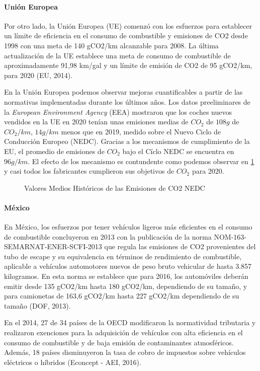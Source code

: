 \paragraph{Unión Europea}
Por otro lado, la Unión Europea (UE) comenzó con los esfuerzos para establecer un límite de eficiencia en el consumo de combustible y emisiones de CO2 desde 1998 con una meta de 140 gCO2/km alcanzable para 2008. La última actualización de la UE establece una meta de consumo de combustible de aproximadamente 91,98 km/gal y un límite de emisión de CO2 de 95 gCO2/km, para 2020 (EU, 2014). \cite{InformeFinal_WRI}

En la Unión Europea podemos observar mejoras cuantificables a partir de las normativas implementadas durante los últimos años. Los datos preeliminares de la \textit{European Environment Agency} (EEA) mostraron que los coches nuevos vendidos en la UE en 2020 tenían unas emisiones medias de $CO_2$ de $108g$ de $CO_2/km$, $14g/km$ menos que en 2019, medido sobre el Nuevo Ciclo de Conducción Europeo (NEDC). \cite{ICCT_Performance_2020} Gracias a los mecanismos de cumplimiento de la EU, el promedio de emisiones de $CO_2$ bajo el Cíclo NEDC se encuentra en $96 g/km$. El efecto de los mecanismo es contundente como podemos observar en \ref{fig:iccp-performance} y casi todos los fabricantes cumplieron sus objetivos de $CO_2$ para 2020.

 \begin{figure}[htbp]
   \centering
   
    \caption{Valores Medios Históricos de las Emisiones de CO2 NEDC \cite{ICCT_Performance_2020}}
    \label{fig:iccp-performance}
\end{figure}

\paragraph{México}
En México, los esfuerzos por tener vehículos ligeros más eficientes en el consumo de combustible concluyeron en 2013 con la publicación de la norma NOM-163-SEMARNAT-ENER-SCFI-2013 que regula las emisiones de CO2 provenientes del tubo de escape y su equivalencia en términos de rendimiento de combustible, aplicable a vehículos automotores nuevos de peso bruto vehicular de hasta 3.857 kilogramos. En esta norma se establece que para 2016, los automóviles deberán emitir desde 135 gCO2/km hasta 180 gCO2/km, dependiendo de su tamaño, y para camionetas de 163,6 gCO2/km hasta 227 gCO2/km dependiendo de su tamaño (DOF, 2013).  \cite{InformeFinal_WRI}

En el 2014, 27 de 34 países de la OECD modificaron la normatividad tributaria y realizaron exenciones para la adquisición de vehículos con alta eficiencia en el consumo de combustible y de baja emisión de contaminantes atmosféricos. Además, 18 países disminuyeron la tasa de cobro de impuestos sobre vehículos eléctricos o híbridos (Econcept - AEI, 2016). \cite{InformeFinal_WRI}



